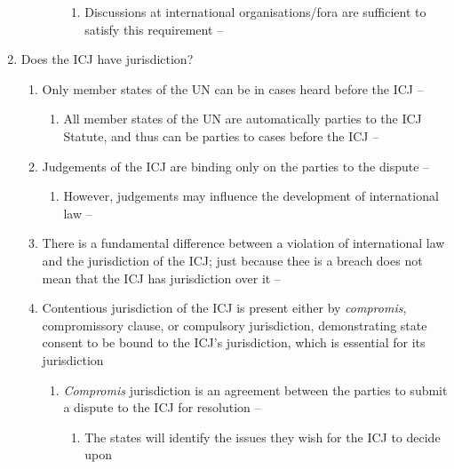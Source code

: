 \begin{enumerate}
\begin{enumerate}
\begin{itemize}
            \begin{enumerate}
                \item Discussions at international organisations/fora are sufficient to satisfy this requirement -- 
            \end{enumerate}
        \end{itemize}
    \end{enumerate}
    \item Does the ICJ have jurisdiction?
    \begin{enumerate}
        \item Only member states of the UN can be in cases heard before the ICJ -- 
        \begin{enumerate}
            \item All member states of the UN are automatically parties to the ICJ Statute, and thus can be parties to cases before the ICJ -- 
        \end{enumerate}
        \item Judgements of the ICJ are binding only on the parties to the dispute -- 
        \begin{enumerate}
            \item However, judgements may influence the development of international law -- 
        \end{enumerate}
        \item There is a fundamental difference between a violation of international law and the jurisdiction of the ICJ; just because thee is a breach does not mean that the ICJ has jurisdiction over it -- 
        \item Contentious jurisdiction of the ICJ is present either by \textit{compromis}, compromissory clause, or compulsory jurisdiction, demonstrating state consent to be bound to the ICJ's jurisdiction, which is essential for its jurisdiction
        \begin{enumerate}
            \item \textit{Compromis} jurisdiction is an agreement between the parties to submit a dispute to the ICJ for resolution -- 
            \begin{enumerate}
                \item The states will identify the issues they wish for the ICJ to decide upon

\end{enumerate}
\end{enumerate}
\end{enumerate}
\end{enumerate}

